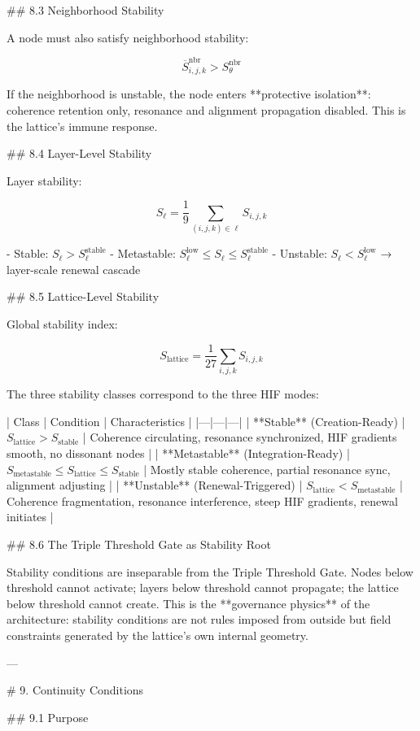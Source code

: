 ## 8.3 Neighborhood Stability

A node must also satisfy neighborhood stability:

\[
\overline{S}^{\text{nbr}}_{i,j,k} > S_{\theta}^{\text{nbr}}
\]

If the neighborhood is unstable, the node enters **protective isolation**: coherence
retention only, resonance and alignment propagation disabled. This is the lattice's
immune response.

## 8.4 Layer-Level Stability

Layer stability:

\[
S_{\ell} = \frac{1}{9} \sum_{(i,j,k)\in\ell} S_{i,j,k}
\]

- Stable: \(S_{\ell} > S_{\ell}^{\text{stable}}\)
- Metastable: \(S_{\ell}^{\text{low}} \le S_{\ell} \le S_{\ell}^{\text{stable}}\)
- Unstable: \(S_{\ell} < S_{\ell}^{\text{low}}\) → layer-scale renewal cascade

## 8.5 Lattice-Level Stability

Global stability index:

\[
S_{\text{lattice}} = \frac{1}{27} \sum_{i,j,k} S_{i,j,k}
\]

The three stability classes correspond to the three HIF modes:

| Class | Condition | Characteristics |
|---|---|---|
| **Stable** (Creation-Ready) | \(S_{\text{lattice}} > S_{\text{stable}}\) | Coherence circulating, resonance synchronized, HIF gradients smooth, no dissonant nodes |
| **Metastable** (Integration-Ready) | \(S_{\text{metastable}} \le S_{\text{lattice}} \le S_{\text{stable}}\) | Mostly stable coherence, partial resonance sync, alignment adjusting |
| **Unstable** (Renewal-Triggered) | \(S_{\text{lattice}} < S_{\text{metastable}}\) | Coherence fragmentation, resonance interference, steep HIF gradients, renewal initiates |

## 8.6 The Triple Threshold Gate as Stability Root

Stability conditions are inseparable from the Triple Threshold Gate. Nodes below
threshold cannot activate; layers below threshold cannot propagate; the lattice
below threshold cannot create. This is the **governance physics** of the
architecture: stability conditions are not rules imposed from outside but field
constraints generated by the lattice's own internal geometry.

---

# 9. Continuity Conditions

## 9.1 Purpose

